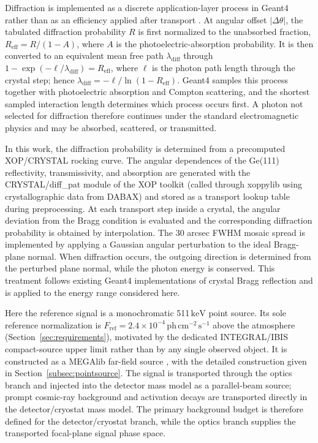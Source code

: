 \documentclass[11pt]{article}
\newcommand{\keV}{\ensuremath{\,\mathrm{keV}}}
\newcommand{\phcms}{\ensuremath{\,\mathrm{ph\,cm^{-2}\,s^{-1}}}}
\newcommand{\fref}{F_{\mathrm{ref}}}
\begin{document}
Diffraction is implemented as a discrete application-layer process in Geant4 rather than as an efficiency applied after transport \cite{Agostinelli2003,Allison2016}. At angular offset $|\Delta\theta|$, the tabulated diffraction probability $R$ is first normalized to the unabsorbed fraction, $R_{\mathrm{eff}}=R/(1-A)$, where $A$ is the photoelectric-absorption probability. It is then converted to an equivalent mean free path $\lambda_{\mathrm{diff}}$ through
$1-\exp(-\ell/\lambda_{\mathrm{diff}})=R_{\mathrm{eff}}$, where $\ell$ is the photon path length through the crystal step; hence $\lambda_{\mathrm{diff}}=-\ell/\ln(1-R_{\mathrm{eff}})$. Geant4 samples this process together with photoelectric absorption and Compton scattering, and the shortest sampled interaction length determines which process occurs first. A photon not selected for diffraction therefore continues under the standard electromagnetic physics and may be absorbed, scattered, or transmitted.

In this work, the diffraction probability is determined from a precomputed XOP/CRYSTAL rocking curve. The angular dependences of the Ge(111) reflectivity, transmissivity, and absorption are generated with the CRYSTAL/diff\_pat module of the XOP toolkit (called through xoppylib using crystallographic data from DABAX) \cite{SanchezDelRio2011XOP} and stored as a transport lookup table during preprocessing. At each transport step inside a crystal, the angular deviation from the Bragg condition is evaluated and the corresponding diffraction probability is obtained by interpolation. The 30 arcsec FWHM mosaic spread is implemented by applying a Gaussian angular perturbation to the ideal Bragg-plane normal. When diffraction occurs, the outgoing direction is determined from the perturbed plane normal, while the photon energy is conserved. This treatment follows existing Geant4 implementations of crystal Bragg reflection \cite{Guan2023BraggReflection,Reiazi2025G4BraggReflection} and is applied to the energy range considered here.

Here the reference signal is a monochromatic 511\keV{} point source. Its sole
reference normalization is $\fref=2.4\times10^{-4}\phcms$ above the atmosphere
(Section~\ref{sec:requirements}), motivated by the dedicated INTEGRAL/IBIS
compact-source upper limit \cite{DeCesare2011} rather than by any single
observed object. It is constructed as a MEGAlib far-field source
\cite{Zoglauer2006}, with the detailed construction given in
Section~\ref{subsec:pointsource}. The signal is transported through the optics
branch and injected into the detector mass model as a parallel-beam source;
prompt cosmic-ray background and activation decays are transported directly in
the detector/cryostat mass model. The primary background budget is therefore
defined for the detector/cryostat branch, while the optics branch supplies the
transported focal-plane signal phase space.
\end{document}
